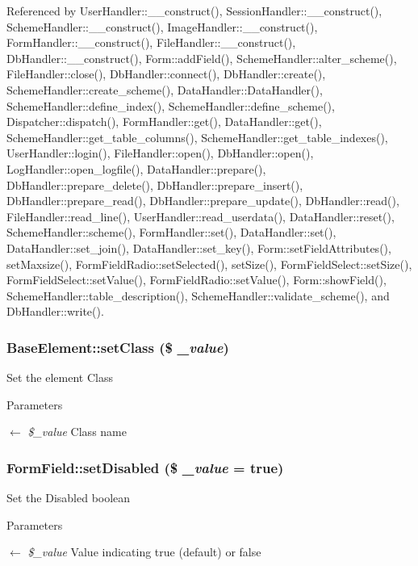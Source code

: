 Referenced by UserHandler::\_\-\_\-construct(), SessionHandler::\_\-\_\-construct(), SchemeHandler::\_\-\_\-construct(), ImageHandler::\_\-\_\-construct(), FormHandler::\_\-\_\-construct(), FileHandler::\_\-\_\-construct(), DbHandler::\_\-\_\-construct(), Form::addField(), SchemeHandler::alter\_\-scheme(), FileHandler::close(), DbHandler::connect(), DbHandler::create(), SchemeHandler::create\_\-scheme(), DataHandler::DataHandler(), SchemeHandler::define\_\-index(), SchemeHandler::define\_\-scheme(), Dispatcher::dispatch(), FormHandler::get(), DataHandler::get(), SchemeHandler::get\_\-table\_\-columns(), SchemeHandler::get\_\-table\_\-indexes(), UserHandler::login(), FileHandler::open(), DbHandler::open(), LogHandler::open\_\-logfile(), DataHandler::prepare(), DbHandler::prepare\_\-delete(), DbHandler::prepare\_\-insert(), DbHandler::prepare\_\-read(), DbHandler::prepare\_\-update(), DbHandler::read(), FileHandler::read\_\-line(), UserHandler::read\_\-userdata(), DataHandler::reset(), SchemeHandler::scheme(), FormHandler::set(), DataHandler::set(), DataHandler::set\_\-join(), DataHandler::set\_\-key(), Form::setFieldAttributes(), setMaxsize(), FormFieldRadio::setSelected(), setSize(), FormFieldSelect::setSize(), FormFieldSelect::setValue(), FormFieldRadio::setValue(), Form::showField(), SchemeHandler::table\_\-description(), SchemeHandler::validate\_\-scheme(), and DbHandler::write().

\subsubsection[{setClass}]{\setlength{\rightskip}{0pt plus 5cm}BaseElement::setClass (\$ {\em \_\-value})}\label{classBaseElement_af6597b30fa9798878f6290271043dfa2}
Set the element Class 
\begin{DoxyParams}{Parameters}
\item[\mbox{$\leftarrow$} {\em \$\_\-value}]Class name \end{DoxyParams}
\subsubsection[{setDisabled}]{\setlength{\rightskip}{0pt plus 5cm}FormField::setDisabled (\$ {\em \_\-value} = {\ttfamily true})}\label{classFormField_a9fa2c828eaf98154edfaa2e755657117}
Set the Disabled boolean 
\begin{DoxyParams}{Parameters}
\item[\mbox{$\leftarrow$} {\em \$\_\-value}]Value indicating true (default) or false \end{DoxyParams}
